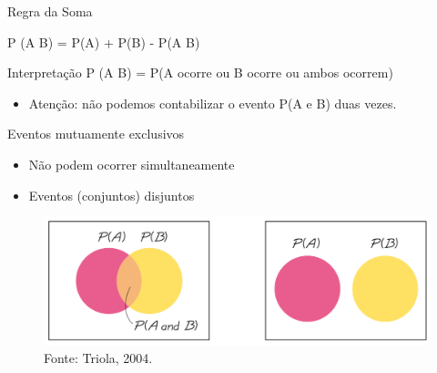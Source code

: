 \documentclass{beamer}
\begin{document}

\begin{frame}{Regra da Soma}
  \begin{definition}
    P (A  B) = P(A) + P(B) - P(A  B)
  \end{definition}
  \begin{block}{Interpretação}
    P (A  B) = P(A ocorre ou B ocorre ou ambos ocorrem)
  \end{block}
  \begin{itemize}
  \item Atenção: não podemos contabilizar o evento P(A e B) duas
    vezes.
  \end{itemize}
\end{frame}

\begin{frame}{Eventos mutuamente exclusivos}
  \begin{itemize}
  \item Não podem ocorrer simultaneamente
  \item Eventos (conjuntos) disjuntos
  \end{itemize}
  \begin{figure}
    \centering
    \includegraphics[height=0.4\textheight]{Prob_I/venn}
    \caption{Fonte: Triola, 2004.}
  \end{figure}
\end{frame}
\end{document}
